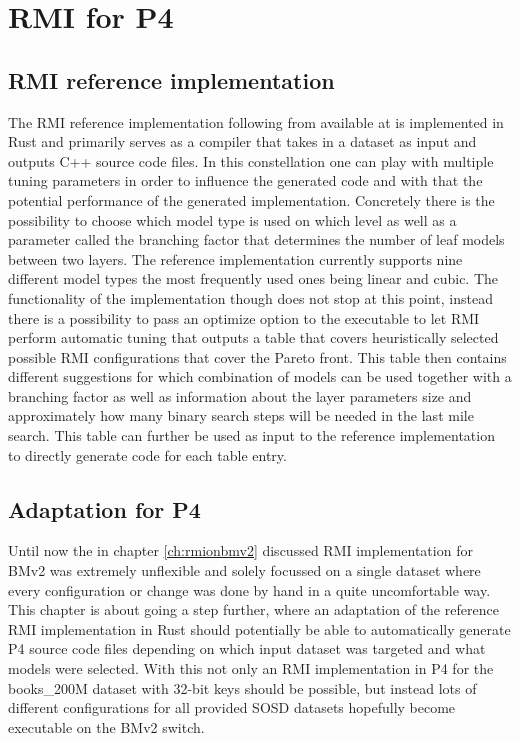 
\chapter{RMI for P4}
\label{ch:rmiforp4}

\section{RMI reference implementation}
The RMI reference implementation following from \cite{cdfshop} available at \cite{rmi-reference} is implemented in Rust and primarily serves as a compiler that takes in a dataset as input and outputs C++ source code files. In this constellation one can play with multiple tuning parameters in order to influence the generated code and with that the potential performance of the generated implementation. Concretely there is the possibility to choose which model type is used on which level as well as a parameter called the branching factor that determines the number of leaf models between two layers. The reference implementation currently supports nine different model types the most frequently used ones being linear and cubic. The functionality of the implementation though does not stop at this point, instead there is a possibility to pass an optimize option to the executable to let RMI perform automatic tuning that outputs a table that covers heuristically selected possible RMI configurations that cover the Pareto front. This table then contains different suggestions for which combination of models can be used together with a branching factor as well as information about the layer parameters size and approximately how many binary search steps will be needed in the last mile search. This table can further be used as input to the reference implementation to directly generate code for each table entry.

\section{Adaptation for P4}
Until now the in chapter \ref{ch:rmionbmv2} discussed RMI implementation for BMv2 was extremely unflexible and solely focussed on a single dataset where every configuration or change was done by hand in a quite uncomfortable way. This chapter is about going a step further, where an adaptation of the reference RMI implementation in Rust should potentially be able to automatically generate P4 source code files depending on which input dataset was targeted and what models were selected. With this not only an RMI implementation in P4 for the books\_200M dataset with 32-bit keys should be possible, but instead lots of different configurations for all provided SOSD datasets hopefully become executable on the BMv2 switch.\\

